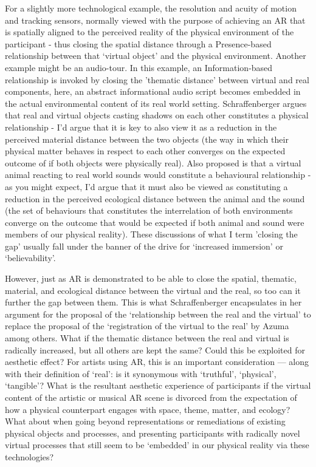 For a slightly more technological example, the resolution and acuity of motion and tracking sensors, normally viewed with the purpose of achieving an AR that is spatially aligned to the perceived reality of the physical environment of the participant - thus closing the spatial distance through a Presence-based relationship between that `virtual object' and the physical environment. Another example might be an audio-tour. In this example, an Information-based relationship is invoked by closing the 'thematic distance' between virtual and real components, here, an abstract informational audio script becomes embedded in the actual environmental content of its real world setting. Schraffenberger argues that real and virtual objects casting shadows on each other constitutes a physical relationship - I'd argue that it is key to also view it as a reduction in the perceived material distance between the two objects (the way in which their physical matter behaves in respect to each other converges on the expected outcome of if both objects were physically real). Also proposed is that a virtual animal reacting to real world sounds would constitute a behavioural relationship - as you might expect, I'd argue that it must also be viewed as constituting a reduction in the perceived ecological distance between the animal and the sound (the set of behaviours that constitutes the interrelation of both environments converge on the outcome that would be expected if both animal and sound were members of our physical reality). These discussions of what I term 'closing the gap' usually fall under the banner of the drive for `increased immersion' or `believability'. 

However, just as AR is demonstrated to be able to close the spatial, thematic, material, and ecological distance between the virtual and the real, so too can it further the gap between them. This is what Schraffenberger encapsulates in her argument for the proposal of the `relationship between the real and the virtual' to replace the proposal of the `registration of the virtual to the real' by Azuma among others. What if the thematic distance between the real and virtual is radically increased, but all others are kept the same? Could this be exploited for aesthetic effect? For artists using AR, this is an important consideration — along with their definition of `real': is it synonymous with `truthful', `physical', `tangible'? What is the resultant aesthetic experience of participants if the virtual content of the artistic or musical AR scene is divorced from the expectation of how a physical counterpart engages with space, theme, matter, and ecology? What about when going beyond representations or remediations of existing physical objects and processes, and presenting participants with radically novel virtual processes that still seem to be `embedded' in our physical reality via these technologies?

